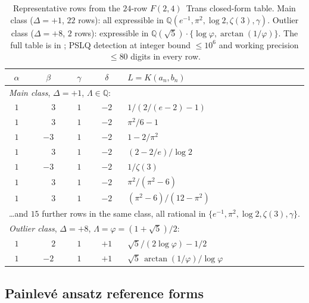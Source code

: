 \documentclass[11pt,reqno]{amsart}
\theoremstyle{definition}
\begin{document}
\begin{table}[h]
\centering
\small
\begin{tabular}{ccccl}
\toprule
$\alpha$ & $\beta$ & $\gamma$ & $\delta$ & $L = K(a_{n},b_{n})$ \\
\midrule
\multicolumn{5}{l}{\textit{Main class}, $\Delta = +1$, $\Lambda\in\mathbb{Q}$:}\\
$1$ & $\phantom{-}3$ & $1$ & $-2$ & $1/(2/(e-2)-1)$ \\
$1$ & $\phantom{-}3$ & $1$ & $-2$ & $\pi^{2}/6 - 1$ \\
$1$ & $-3$ & $1$ & $-2$ & $1 - 2/\pi^{2}$ \\
$1$ & $\phantom{-}3$ & $1$ & $-2$ & $(2-2/e)/\log 2$ \\
$1$ & $-3$ & $1$ & $-2$ & $1/\zeta(3)$ \\
$1$ & $\phantom{-}3$ & $1$ & $-2$ & $\pi^{2}/(\pi^{2}-6)$ \\
$1$ & $\phantom{-}3$ & $1$ & $-2$ & $(\pi^{2}-6)/(12-\pi^{2})$ \\
\multicolumn{5}{l}{\quad\ldots and $15$ further rows in
the same class, all rational in $\{e^{-1}, \pi^{2}, \log 2,
\zeta(3), \gamma\}$.}\\
\midrule
\multicolumn{5}{l}{\textit{Outlier class},
$\Delta = +8$, $\Lambda = \varphi = (1+\sqrt{5})/2$:}\\
$1$ & $\phantom{-}2$ & $1$ & $+1$ & $\sqrt{5}/(2\log\varphi) - 1/2$ \\
$1$ & $-2$ & $1$ & $+1$ & $\sqrt{5}\,\arctan(1/\varphi) / \log\varphi$ \\
\bottomrule
\end{tabular}
\caption{Representative rows from the $24$-row $F(2,4)$~Trans
closed-form table. Main class ($\Delta=+1$, $22$ rows): all
expressible in $\mathbb{Q}(e^{-1},\pi^{2},\log 2,\zeta(3),\gamma)$.
Outlier class ($\Delta=+8$, $2$ rows): expressible in
$\mathbb{Q}(\sqrt{5})\cdot\{\log\varphi,
\arctan(1/\varphi)\}$. The full table is in
\cite[Appendix~B]{Papanokechi2026F24}; PSLQ detection at
integer bound $\le 10^{6}$ and working precision $\le 80$
digits in every row.}
\label{tab:f24-trans-rows}
\end{table}

\subsection{Painlev\'e ansatz reference forms}\label{app:painleve-forms}
\end{document}
